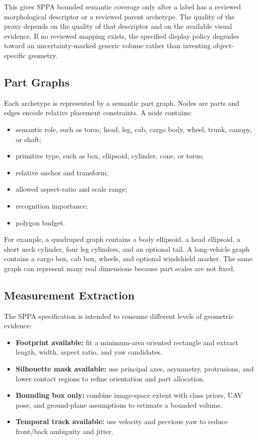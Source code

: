 ﻿\documentclass[11pt,a4paper]{article}
\begin{document}
This gives SPPA bounded semantic coverage only after a label has a reviewed
morphological descriptor or a reviewed parent archetype. The quality of the
proxy depends on the quality of that descriptor and on the available visual
evidence. If no reviewed mapping exists, the specified display policy degrades
toward an uncertainty-marked generic volume rather than inventing object-specific
geometry.

\subsection{Part Graphs}

Each archetype is represented by a semantic part graph. Nodes are parts and
edges encode relative placement constraints. A node contains:

\begin{itemize}
    \item semantic role, such as torso, head, leg, cab, cargo body, wheel, trunk,
    canopy, or shaft;
    \item primitive type, such as box, ellipsoid, cylinder, cone, or torus;
    \item relative anchor and transform;
    \item allowed aspect-ratio and scale range;
    \item recognition importance;
    \item polygon budget.
\end{itemize}

For example, a quadruped graph contains a body ellipsoid, a head ellipsoid, a
short neck cylinder, four leg cylinders, and an optional tail. A long-vehicle
graph contains a cargo box, cab box, wheels, and optional windshield marker. The
same graph can represent many real dimensions because part scales are not fixed.

\subsection{Measurement Extraction}

The SPPA specification is intended to consume different levels of geometric
evidence:

\begin{itemize}
    \item \textbf{Footprint available:} fit a minimum-area oriented rectangle
    and extract length, width, aspect ratio, and yaw candidates.
    \item \textbf{Silhouette mask available:} use principal axes, asymmetry,
    protrusions, and lower contact regions to refine orientation and part
    allocation.
    \item \textbf{Bounding box only:} combine image-space extent with class
    priors, UAV pose, and ground-plane assumptions to estimate a bounded
    volume.
    \item \textbf{Temporal track available:} use velocity and previous yaw to
    reduce front/back ambiguity and jitter.
\end{itemize}
\end{document}
